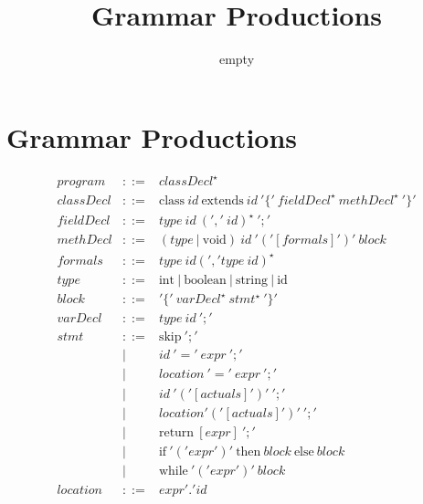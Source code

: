 \documentclass{article}
\title{Grammar Productions}
\author{empty}
\begin{document}
\maketitle %

%	

\section{Grammar Productions}
$$
\begin{array}{rcl}
 program & ::= & classDecl ^{\star} \\
 classDecl & ::= & \textrm{class} ~id~ \textrm{extends} ~id~ '\{'~ fieldDecl^{\star}~  methDecl^{\star} ~'\}'  \\
 fieldDecl & ::= & type~id ~(',' ~id)^{\star} ~';' \\
 methDecl & ::= & (type~|~\textrm{void})~id~ '('[formals]')'~ block \\
 formals & ::= & type~id (',' type~id)^{\star} \\
 type & ::= & \textrm{int}~|~\textrm{boolean}~|~\textrm{string}~|~\textrm{id}\\
 block & ::= & '\{'~varDecl^{\star} ~stmt^{\star}~'\}' \\
 varDecl & ::= & type~id ~';' \\
 stmt & ::= & \textrm{skip} ~';'\\
 & | & id ~'='~ expr ~';'\\
 & | & location ~'='~ expr ~';'\\
 & | & id~'('[actuals]')'~';'\\
 & | & location'('[actuals]')'~';'\\
 & | & \textrm{return} ~[expr] ~';'\\
 & | & \textrm{if} ~'('expr')' ~\textrm{then} ~block ~\textrm{else} ~block \\
 & | & \textrm{while} ~'('expr')' ~block\\
 location & ::= & expr'.'id\\

\end{array}$$
\end{document}

